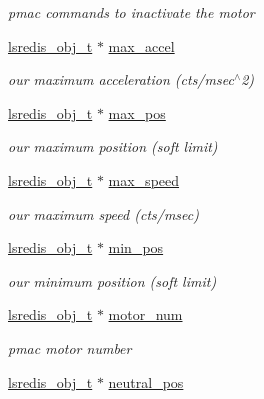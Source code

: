\begin{DoxyCompactItemize}
\begin{DoxyCompactList}\small\item\em pmac commands to inactivate the motor \end{DoxyCompactList}\item 
\hyperlink{pgpmac_8h_ad449de06d02791adf2498d2a1e1f909c}{lsredis\-\_\-obj\-\_\-t} $\ast$ \hyperlink{structlspmac__motor__struct_a50cf4c0711cea164e332bc34705a1a68}{max\-\_\-accel}
\begin{DoxyCompactList}\small\item\em our maximum acceleration (cts/msec$^\wedge$2) \end{DoxyCompactList}\item 
\hyperlink{pgpmac_8h_ad449de06d02791adf2498d2a1e1f909c}{lsredis\-\_\-obj\-\_\-t} $\ast$ \hyperlink{structlspmac__motor__struct_aac8c31a857910cdcbb409331e128e766}{max\-\_\-pos}
\begin{DoxyCompactList}\small\item\em our maximum position (soft limit) \end{DoxyCompactList}\item 
\hyperlink{pgpmac_8h_ad449de06d02791adf2498d2a1e1f909c}{lsredis\-\_\-obj\-\_\-t} $\ast$ \hyperlink{structlspmac__motor__struct_a69e49769a1001665377efc7193d88a0a}{max\-\_\-speed}
\begin{DoxyCompactList}\small\item\em our maximum speed (cts/msec) \end{DoxyCompactList}\item 
\hyperlink{pgpmac_8h_ad449de06d02791adf2498d2a1e1f909c}{lsredis\-\_\-obj\-\_\-t} $\ast$ \hyperlink{structlspmac__motor__struct_a7c1f2f67c64d26b12d6bb0d681797d8d}{min\-\_\-pos}
\begin{DoxyCompactList}\small\item\em our minimum position (soft limit) \end{DoxyCompactList}\item 
\hyperlink{pgpmac_8h_ad449de06d02791adf2498d2a1e1f909c}{lsredis\-\_\-obj\-\_\-t} $\ast$ \hyperlink{structlspmac__motor__struct_ad6a51cca3c7e5f79168e5c33fd9e736b}{motor\-\_\-num}
\begin{DoxyCompactList}\small\item\em pmac motor number \end{DoxyCompactList}\item 
\hyperlink{pgpmac_8h_ad449de06d02791adf2498d2a1e1f909c}{lsredis\-\_\-obj\-\_\-t} $\ast$ \hyperlink{structlspmac__motor__struct_ae931e9bc9fc2fa82ca649334fc052fbe}{neutral\-\_\-pos}

\end{DoxyCompactItemize}
